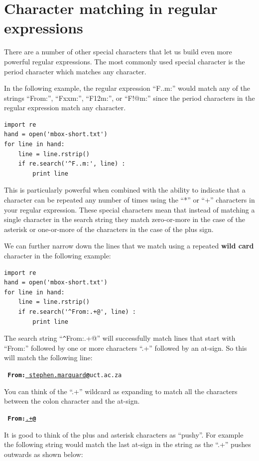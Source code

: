 \documentclass[10pt]{book}
\begin{document}
\section{Character matching in regular expressions}

There are a number of other special characters that let us build even more powerful regular expressions.  The most commonly used special character is the period character which matches any character.

In the following example, the regular expression ``F..m:'' would match any of the strings ``From:'', ``Fxxm:'', ``F12m:'', or ``F!@m:'' since the period characters in the regular expression match any character.

\beforeverb
\begin{verbatim}
import re
hand = open('mbox-short.txt')
for line in hand:
    line = line.rstrip()
    if re.search('^F..m:', line) :
        print line
\end{verbatim}
\afterverb
%
This is particularly powerful when combined with the ability to indicate that a character can be repeated any number of times using the ``*'' or ``+'' characters in your regular expression.   These special characters mean that instead of matching a single character in the search string they match zero-or-more in the case of the asterisk or one-or-more of the characters in the case of the plus sign.

We can further narrow down the lines that we match using a repeated {\bf wild card} character in the following example:

\beforeverb
\begin{verbatim}
import re
hand = open('mbox-short.txt')
for line in hand:
    line = line.rstrip()
    if re.search('^From:.+@', line) :
        print line
\end{verbatim}
\afterverb
%
The search string ``\verb"^"From:.+@'' will successfully match lines that start with ``From:'' followed by one or more characters ``.+'' followed by an at-sign.  So this will match the following line:

{\tt
{\bf From:}\underline{ stephen.marquard}{\bf @}uct.ac.za
}

You can think of the ``.+'' wildcard as expanding to match all the characters between the 
colon character and the at-sign.  


{\tt
{\bf From:}\underline{.+}{\bf @}
}

It is good to think of the plus and asterisk characters as ``pushy''.  For example the following string would match the last at-sign in the string as the ``.+'' pushes outwards as shown below:
\end{document}
